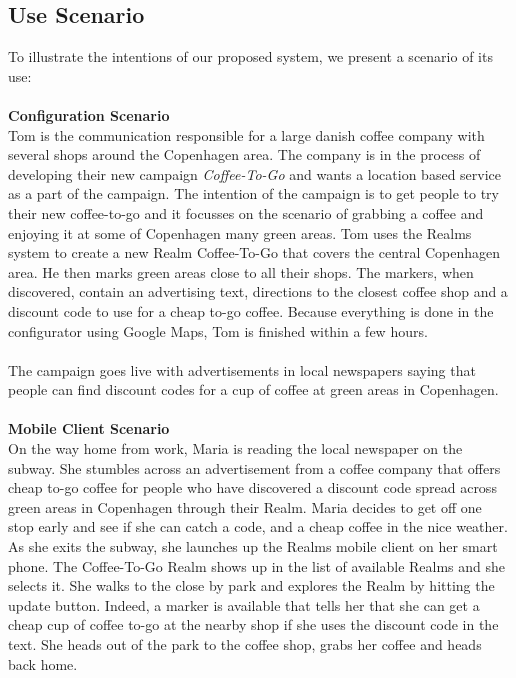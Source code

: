 \subsection{Use Scenario} %
\label{sub:scenario}
To illustrate the intentions of our proposed system, we present a scenario of its use:
\\\\
\textbf{Configuration Scenario}\\
Tom is the communication responsible for a large danish coffee company with several shops around the Copenhagen area. The company is in the process of developing their new campaign \emph{Coffee-To-Go} and wants a location based service as a part of the campaign. The intention of the campaign is to get people to try their new coffee-to-go and it focusses on the scenario of grabbing a coffee and enjoying it at some of Copenhagen many green areas. Tom uses the Realms system to create a new Realm Coffee-To-Go that covers the central Copenhagen area. He then marks green areas close to all their shops. The markers, when discovered, contain an advertising text, directions to the closest coffee shop and a discount code to use for a cheap to-go coffee. Because everything is done in the configurator using Google Maps, Tom is finished within a few hours.
\\\\
The campaign goes live with advertisements in local newspapers saying that people can find discount codes for a cup of coffee at green areas in Copenhagen. 
\\\\
\textbf{Mobile Client Scenario}\\
On the way home from work, Maria is reading the local newspaper on the subway. She stumbles across an advertisement from a coffee company that offers cheap to-go coffee for people who have discovered a discount code spread across green areas in Copenhagen through their Realm. Maria decides to get off one stop early and see if she can catch a code, and a cheap coffee in the nice weather. As she exits the subway, she launches up the Realms mobile client on her smart phone. The Coffee-To-Go Realm shows up in the list of available Realms and she selects it. She walks to the close by park and explores the Realm by hitting the update button. Indeed, a marker is available that tells her that she can get a cheap cup of coffee to-go at the nearby shop if she uses the discount code in the text. She heads out of the park to the coffee shop, grabs her coffee and heads back home.



